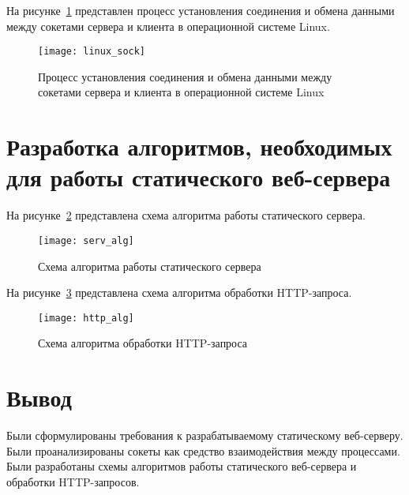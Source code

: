 На рисунке~\ref{linux_sock} представлен процесс установления соединения и обмена данными между сокетами сервера и клиента в операционной системе Linux.
\begin{figure}[H]
	\centering
	\texttt{[image: linux\_sock]}
	\caption{Процесс установления соединения и обмена данными между сокетами сервера и клиента в операционной системе Linux}
	\label{linux_sock}
\end{figure}

\section{Разработка алгоритмов, необходимых для работы статического веб-сервера}

На рисунке~\ref{serv_alg} представлена схема алгоритма работы статического сервера.
\begin{figure}[H]
	\centering
	\texttt{[image: serv\_alg]}
	\caption{Схема алгоритма работы статического сервера}
	\label{serv_alg}
\end{figure}

На рисунке~\ref{http_alg} представлена схема алгоритма обработки HTTP-запроса.
\begin{figure}[H]
	\centering
	\texttt{[image: http\_alg]}
	\caption{Схема алгоритма обработки HTTP-запроса}
	\label{http_alg}
\end{figure}

\section*{Вывод}

Были сформулированы требования к разрабатываемому статическому веб-серверу.
Были проанализированы сокеты как средство взаимодействия между процессами.
Были разработаны схемы алгоритмов работы статического веб-сервера и обработки HTTP-запросов.

\clearpage
